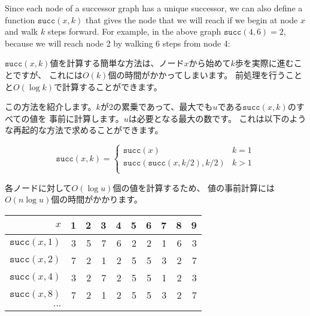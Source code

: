 Since each node of a successor graph has a
unique successor, we can also define a function $\texttt{succ}(x,k)$
that gives the node that we will reach if
we begin at node $x$ and walk $k$ steps forward.
For example, in the above graph $\texttt{succ}(4,6)=2$,
because we will reach node 2 by walking 6 steps from node 4:

\begin{center}
\end{center}

$\texttt{succ}(x,k)$値を計算する簡単な方法は、ノード$x$から始めて$k$歩を実際に進むことですが、
これには$O(k)$個の時間がかかってしまいます。
前処理を行うことと$O(\log k)$で計算することができます。

この方法を紹介します。$k$が2の累乗であって、最大でも$u$である$\texttt{succ}(x,k)$のすべての値を
事前に計算します。$u$は必要となる最大の数です。
これは以下のような再起的な方法で求めることができます。　

\begin{equation*}
    \texttt{succ}(x,k) = \begin{cases}
               \texttt{succ}(x)              & k = 1\\
               \texttt{succ}(\texttt{succ}(x,k/2),k/2)   & k > 1\\
           \end{cases}
\end{equation*}

各ノードに対して$O(\log u)$個の値を計算するため、
値の事前計算には$O(n \log u)$個の時間がかかります。

\begin{center}
\begin{tabular}{r|rrrrrrrrr}
$x$ & 1 & 2 & 3 & 4 & 5 & 6 & 7 & 8 & 9 \\
\hline
$\texttt{succ}(x,1)$ & 3 & 5 & 7 & 6 & 2 & 2 & 1 & 6 & 3 \\
$\texttt{succ}(x,2)$ & 7 & 2 & 1 & 2 & 5 & 5 & 3 & 2 & 7 \\
$\texttt{succ}(x,4)$ & 3 & 2 & 7 & 2 & 5 & 5 & 1 & 2 & 3 \\
$\texttt{succ}(x,8)$ & 7 & 2 & 1 & 2 & 5 & 5 & 3 & 2 & 7 \\
$\cdots$ \\
\end{tabular}
\end{center}

